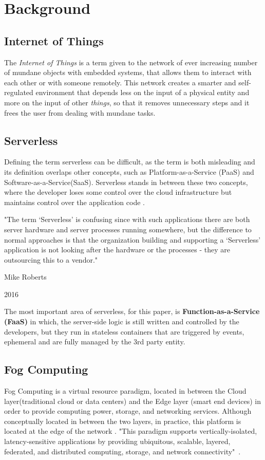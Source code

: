 \section{Background}

\subsection{Internet of Things}\label{sec:dialecto}
The \textit{Internet of Things} is a term given to the network of ever increasing
number of mundane objects with embedded systems, that allows them to interact with
each other or with someone remotely. This network creates a smarter and
self-regulated environment that depends less on the input of a physical entity and
more on the input of other \textit{things}, so that it removes unnecessary steps
and it frees the user from dealing with mundane tasks.

\subsection{Serverless}
Defining the term serverless can be difficult, as the term is both misleading and
its definition overlaps other concepts, such as Platform-as-a-Service (PaaS) and
Software-as-a-Service(SaaS). Serverless stands in between these two concepts, where
the developer loses some control over the cloud infrastructure but maintains
control over the application code \cite{kn:Baldini}.

"The term ‘Serverless’ is confusing since with such applications there are both
server hardware and server processes running somewhere, but the difference to
normal approaches is that the organization building and supporting a ‘Serverless’ application is not looking after the hardware or the processes - they are outsourcing this to a vendor." 

\hfill Mike Roberts

\hfill 2016

The most important area of serverless, for this paper, is
\textbf{Function-as-a-Service (FaaS)} in which, the server-side logic is still
written and controlled by the developers, but they run in stateless containers
that are triggered by events, ephemeral and are fully managed by the 3rd party
entity.

\subsection{Fog Computing}
Fog Computing is a virtual resource paradigm, located in between the Cloud
layer(traditional cloud or data centers) and the Edge layer (smart end devices) in
order to provide computing power, storage, and networking services. Although
conceptually located in between the two layers, in practice, this platform is located at the
edge of the network \cite{kn:Bonomi}. "This paradigm supports vertically-isolated,
latency-sensitive applications by providing ubiquitous, scalable, layered,
federated, and distributed computing, storage, and network connectivity"~\cite{kn:Iorga2017}. 


